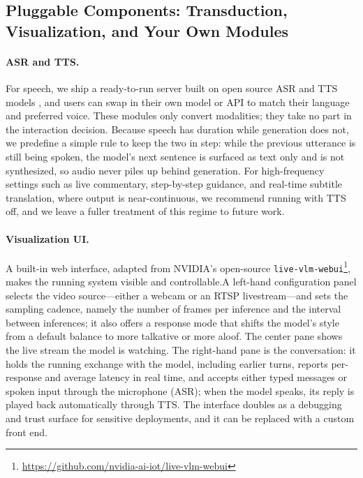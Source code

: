 \documentclass{llmxive}
\begin{document}
\subsection{Pluggable Components: Transduction, Visualization, and Your Own Modules}\label{sec:sys-plug}
\paragraph{\textbf{ASR and TTS.}} For speech, we ship a ready-to-run server built on open source ASR \cite{gao2023funasr} and TTS models \cite{du2025cosyvoice}, and users can swap in their own model or API to match their language and preferred voice. These modules only convert modalities; they take no part in the interaction decision. Because speech has duration while generation does not, we predefine a simple rule to keep the two in step: while the previous utterance is still being spoken, the model's next sentence is surfaced as text only and is not synthesized, so audio never piles up behind generation. For high-frequency settings such as live commentary, step-by-step guidance, and real-time subtitle translation, where output is near-continuous, we recommend running with TTS off, and we leave a fuller treatment of this regime to future work.

\paragraph{\textbf{Visualization UI.}} A built-in web interface, adapted from NVIDIA's open-source \texttt{live-vlm-webui}\footnote{\url{https://github.com/nvidia-ai-iot/live-vlm-webui}}, makes the running system visible and controllable.A left-hand configuration panel selects the video source—either a webcam or an RTSP livestream—and sets the sampling cadence, namely the number of frames per inference and the interval between inferences; it also offers a response mode that shifts the model's style from a default balance to more talkative or more aloof. The center pane shows the live stream the model is watching. The right-hand pane is the conversation: it holds the running exchange with the model, including earlier turns, reports per-response and average latency in real time, and accepts either typed messages or spoken input through the microphone (ASR); when the model speaks, its reply is played back automatically through TTS. The interface doubles as a debugging and trust surface for sensitive deployments, and it can be replaced with a custom front end.
\end{document}
